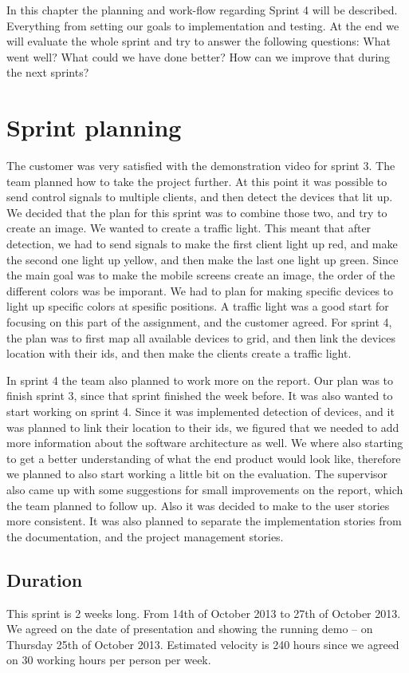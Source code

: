 In this chapter the planning and work-flow regarding Sprint 4 will be described. 
Everything from setting our goals to implementation and testing. At the end we will evaluate the whole sprint and try to answer the following questions: What went well? What could we have done better? How can we improve that during the next sprints? 

\section{Sprint planning}

The customer was very satisfied with the demonstration video for sprint 3. The team planned how to take the project further. At this point it was possible to send control signals to multiple clients, and then detect the devices that lit up. We decided that the plan for this sprint was to combine those two, and try to create an image. We wanted to create a traffic light. This meant that after detection, we had to send signals to make the first client light up red, and make the second one light up yellow, and then make the last one light up green. Since the main goal was to make the mobile screens create an image, the order of the different colors was be imporant. We had to plan for making specific devices to light up specific colors at spesific positions. A traffic light was a good start for focusing on this part of the assignment, and the customer agreed. For sprint 4, the plan was to first map all available devices to grid, and then link the devices location with their ids, and then make the clients create a traffic light.  


In sprint 4 the team also planned to work more on the report. Our plan was to finish sprint 3, since that sprint finished the week before. It was also wanted to start working on sprint 4. Since it was implemented detection of devices, and it was planned to link their location to their ids, we figured that we needed to add more information about the software architecture as well. We where also starting to get a better understanding of what the end product would look like, therefore we planned to also start working a little bit on the evaluation. The supervisor also came up with some suggestions for small improvements on the report, which the team planned to follow up. Also it was decided to make to the user stories more consistent. It was also planned to separate the implementation stories from the documentation, and the project management stories.

\subsection{Duration}
This sprint is 2 weeks long. From 14th of October 2013 to 27th of October 2013. We agreed
on the date of presentation and showing the running demo – on Thursday 25th of October 2013.
Estimated velocity is 240 hours since we agreed on 30 working hours per person per week.

